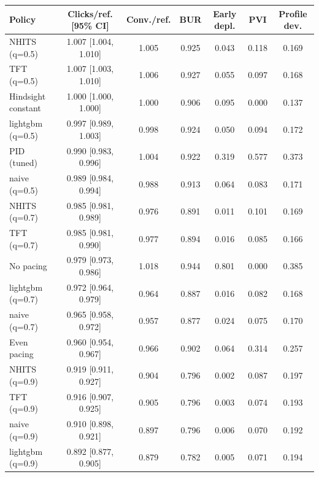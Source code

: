 \begin{tabular}{lcccccc}
\toprule
Policy & Clicks/ref. [95\% CI] & Conv./ref. & BUR & Early depl. & PVI & Profile dev. \\
\midrule
NHITS (q=0.5) & 1.007 [1.004, 1.010] & 1.005 & 0.925 & 0.043 & 0.118 & 0.169 \\
TFT (q=0.5) & 1.007 [1.003, 1.010] & 1.006 & 0.927 & 0.055 & 0.097 & 0.168 \\
Hindsight constant & 1.000 [1.000, 1.000] & 1.000 & 0.906 & 0.095 & 0.000 & 0.137 \\
lightgbm (q=0.5) & 0.997 [0.989, 1.003] & 0.998 & 0.924 & 0.050 & 0.094 & 0.172 \\
PID (tuned) & 0.990 [0.983, 0.996] & 1.004 & 0.922 & 0.319 & 0.577 & 0.373 \\
naive (q=0.5) & 0.989 [0.984, 0.994] & 0.988 & 0.913 & 0.064 & 0.083 & 0.171 \\
NHITS (q=0.7) & 0.985 [0.981, 0.989] & 0.976 & 0.891 & 0.011 & 0.101 & 0.169 \\
TFT (q=0.7) & 0.985 [0.981, 0.990] & 0.977 & 0.894 & 0.016 & 0.085 & 0.166 \\
No pacing & 0.979 [0.973, 0.986] & 1.018 & 0.944 & 0.801 & 0.000 & 0.385 \\
lightgbm (q=0.7) & 0.972 [0.964, 0.979] & 0.964 & 0.887 & 0.016 & 0.082 & 0.168 \\
naive (q=0.7) & 0.965 [0.958, 0.972] & 0.957 & 0.877 & 0.024 & 0.075 & 0.170 \\
Even pacing & 0.960 [0.954, 0.967] & 0.966 & 0.902 & 0.064 & 0.314 & 0.257 \\
NHITS (q=0.9) & 0.919 [0.911, 0.927] & 0.904 & 0.796 & 0.002 & 0.087 & 0.197 \\
TFT (q=0.9) & 0.916 [0.907, 0.925] & 0.905 & 0.796 & 0.003 & 0.074 & 0.193 \\
naive (q=0.9) & 0.910 [0.898, 0.921] & 0.897 & 0.796 & 0.006 & 0.070 & 0.192 \\
lightgbm (q=0.9) & 0.892 [0.877, 0.905] & 0.879 & 0.782 & 0.005 & 0.071 & 0.194 \\
\bottomrule
\end{tabular}